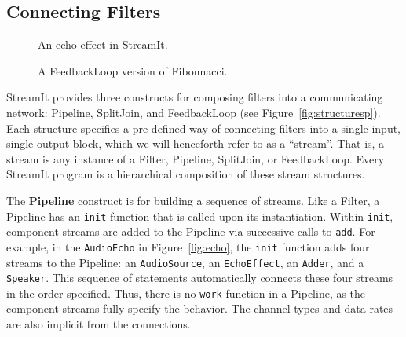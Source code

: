 \subsection{Connecting Filters}
\label{sec:connecting}

\begin{figure}[t]
\begin{minipage}{3in}
\caption{\protect\small An echo effect in StreamIt.
\protect\label{fig:echo}}
\vspace{8pt}
\end{minipage}
\begin{minipage}{3in}
\caption{\protect\small A FeedbackLoop version of Fibonnacci.
\protect\label{fig:feed}}
\end{minipage}
\end{figure}

StreamIt provides three constructs for composing filters into a
communicating network: Pipeline, SplitJoin, and FeedbackLoop (see
Figure~\ref{fig:structuresp}).  Each structure specifies a pre-defined
way of connecting filters into a single-input, single-output block,
which we will henceforth refer to as a ``stream''.  That is, a stream
is any instance of a Filter, Pipeline, SplitJoin, or FeedbackLoop.
Every StreamIt program is a hierarchical composition of these stream
structures.

The {\bf Pipeline} construct is for building a sequence of streams.
Like a Filter, a Pipeline has an {\tt init} function that is called upon
its instantiation.  Within {\tt init}, component streams are added to
the Pipeline via successive calls to {\tt add}.  For example, in the
{\tt AudioEcho} in Figure~\ref{fig:echo}, the {\tt init} function adds
four streams to the Pipeline: an {\tt AudioSource}, an {\tt EchoEffect},
an {\tt Adder}, and a {\tt Speaker}.  This sequence of statements
automatically connects these four streams in the order specified.  Thus,
there is no {\tt work} function in a Pipeline, as the component streams
fully specify the behavior.  The channel types and data rates are also
implicit from the connections.

